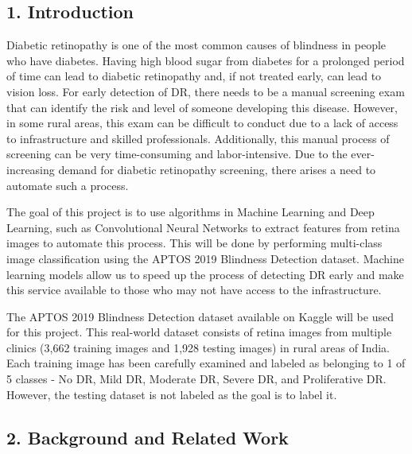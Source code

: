 \documentclass[
]{article}
\begin{document}
\hypertarget{introduction}{%
\subsection{\texorpdfstring{\textbf{1. Introduction}}{Introduction}}\label{introduction}}

Diabetic retinopathy is one of the most common causes of blindness in
people who have diabetes. Having high blood sugar from diabetes for a
prolonged period of time can lead to diabetic retinopathy and, if not
treated early, can lead to vision loss. For early detection of DR, there
needs to be a manual screening exam that can identify the risk and level
of someone developing this disease. However, in some rural areas, this
exam can be difficult to conduct due to a lack of access to
infrastructure and skilled professionals. Additionally, this manual
process of screening can be very time-consuming and labor-intensive. Due
to the ever-increasing demand for diabetic retinopathy screening, there
arises a need to automate such a process.

The goal of this project is to use algorithms in Machine Learning and
Deep Learning, such as Convolutional Neural Networks to extract features
from retina images to automate this process. This will be done by
performing multi-class image classification using the APTOS 2019
Blindness Detection dataset. Machine learning models allow us to speed
up the process of detecting DR early and make this service available to
those who may not have access to the infrastructure.

The APTOS 2019 Blindness Detection dataset available on Kaggle will be
used for this project. This real-world dataset consists of retina images
from multiple clinics (3,662 training images and 1,928 testing images)
in rural areas of India. Each training image has been carefully examined
and labeled as belonging to 1 of 5 classes - No DR, Mild DR, Moderate
DR, Severe DR, and Proliferative DR. However, the testing dataset is not
labeled as the goal is to label it.

\hypertarget{background-and-related-work}{%
\subsection{\texorpdfstring{\textbf{2. Background and Related
Work}}{Background and Related Work}}\label{background-and-related-work}}
\end{document}
